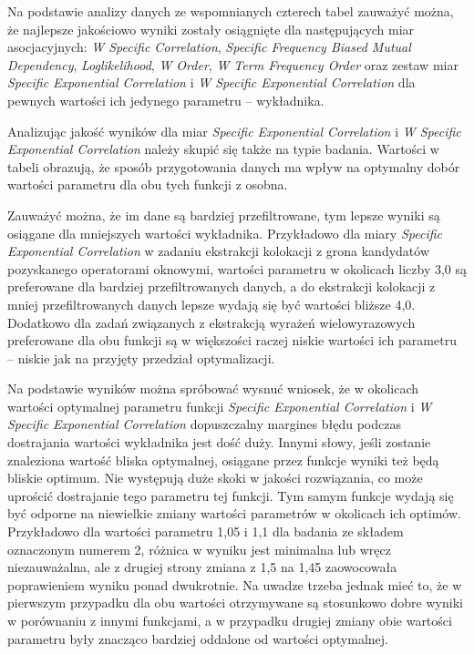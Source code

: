 Na podstawie analizy danych ze wspomnianych czterech tabel zauważyć można, że najlepsze jakościowo wyniki zostały osiągnięte dla następujących miar asocjacyjnych: \emph{W Specific Correlation}, \emph{Specific Frequency Biased Mutual Dependency}, \emph{Loglikelihood}, \emph{W Order}, \emph{W Term Frequency Order} oraz zestaw miar \emph{Specific Exponential Correlation} i \emph{W Specific Exponential Correlation} dla pewnych wartości ich jedynego parametru -- wykładnika.

\par
Analizując jakość wyników dla miar \emph{Specific Exponential Correlation} i \emph{W Specific Exponential Correlation} należy skupić się także na typie badania.
Wartości w tabeli obrazują, że sposób przygotowania danych ma wpływ na optymalny dobór wartości parametru dla obu tych funkcji z osobna.

\par
Zauważyć można, że im dane są bardziej przefiltrowane, tym lepsze wyniki są osiągane dla mniejszych wartości wykładnika.
Przykładowo dla miary \emph{Specific Exponential Correlation} w zadaniu ekstrakcji kolokacji z grona kandydatów pozyskanego operatorami oknowymi, wartości parametru w okolicach liczby 3,0 są preferowane dla bardziej przefiltrowanych danych, a do ekstrakcji kolokacji z mniej przefiltrowanych danych lepsze wydają się być wartości bliższe 4,0.
Dodatkowo dla zadań związanych z ekstrakcją wyrażeń wielowyrazowych preferowane dla obu funkcji są w większości raczej niskie wartości ich parametru -- niskie jak na przyjęty przedział optymalizacji.

\par
Na podstawie wyników można spróbować wysnuć wniosek, że w okolicach wartości optymalnej parametru funkcji \emph{Specific Exponential Correlation} i \emph{W Specific Exponential Correlation} dopuszczalny margines błędu podczas dostrajania wartości wykładnika jest dość duży.
Innymi słowy, jeśli zostanie znaleziona wartość bliska optymalnej, osiągane przez funkcje wyniki też będą bliskie optimum.
Nie występują duże skoki w jakości rozwiązania, co może uprościć dostrajanie tego parametru tej funkcji.
Tym samym funkcje wydają się być odporne na niewielkie zmiany wartości parametrów w okolicach ich optimów.
Przykładowo dla wartości parametru 1,05 i 1,1 dla badania ze składem oznaczonym numerem 2, różnica w wyniku jest minimalna lub wręcz niezauważalna, ale z drugiej strony zmiana z 1,5 na 1,45 zaowocowała poprawieniem wyniku ponad dwukrotnie.
Na uwadze trzeba jednak mieć to, że w pierwszym przypadku dla obu wartości otrzymywane są stosunkowo dobre wyniki w porównaniu z innymi funkcjami, a w przypadku drugiej zmiany obie wartości parametru były znacząco bardziej oddalone od wartości optymalnej.

